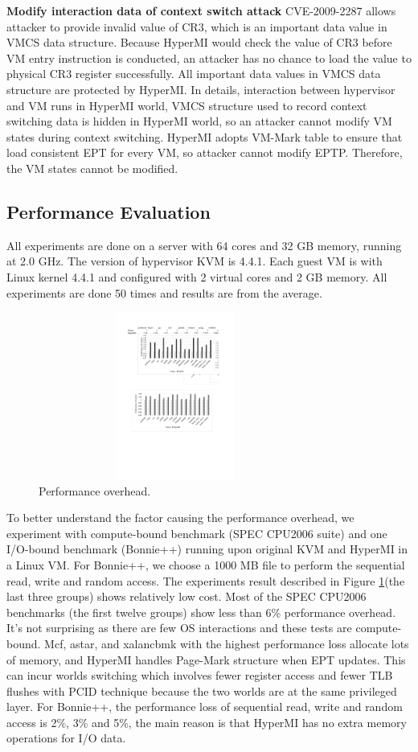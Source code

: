 \documentclass[conference]{IEEEtran}
\begin{document}
\textbf{Modify interaction data of context switch attack}
CVE-2009-2287 allows attacker to provide invalid value of CR3, which is an important data value in VMCS data structure. Because HyperMI would check the value of CR3 before VM entry instruction is conducted, an attacker has no chance to load the value to physical CR3 register successfully. All important data values in VMCS data structure are protected by HyperMI. In details, interaction between hypervisor and VM runs in HyperMI world, VMCS structure used to record context switching data is hidden in HyperMI world, so an attacker cannot modify VM states during context switching. HyperMI adopts VM-Mark table to ensure that load consistent EPT for every VM, so attacker cannot modify EPTP. Therefore, the VM states cannot be modified. 


\subsection{Performance Evaluation}

All experiments are done on a server with 64 cores and 32 GB memory, running at 2.0 GHz. The version of hypervisor KVM is 4.4.1. Each guest VM is with Linux kernel 4.4.1 and configured with 2 virtual cores and 2 GB memory. All experiments are done 50 times and results are from the average.

\begin{figure}
\centerline{\includegraphics[width=9cm,height=5.5cm]{performance.pdf}}
\caption{Performance overhead.} \label{fig5}
\end{figure}

To better understand the factor causing the performance overhead, we experiment with compute-bound benchmark (SPEC CPU2006 suite) and one I/O-bound benchmark (Bonnie++) running upon original KVM and HyperMI in a Linux VM. For Bonnie++, we choose a 1000 MB file to perform the sequential read, write and random access. The experiments result described in Figure \ref{fig5}(the last three groups) shows relatively low cost. Most of the SPEC CPU2006 benchmarks (the first twelve groups) show less than 6\% performance overhead. It's not surprising as there are few OS interactions and these tests are compute-bound. Mcf, astar, and xalancbmk with the highest performance loss allocate lots of memory, and HyperMI handles Page-Mark structure when EPT updates. This can incur worlds switching which involves fewer register access and fewer TLB flushes with PCID technique because the two worlds are at the same privileged layer. For Bonnie++, the performance loss of sequential read, write and random access is 2\%, 3\% and 5\%, the main reason is that HyperMI has no extra memory operations for I/O data. 
\end{document}
